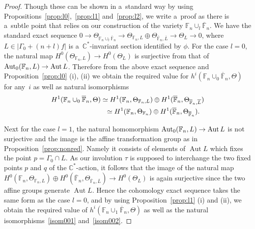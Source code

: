 \documentclass[11pt]{article}
\numberwithin{equation}{section}
\DeclareMathOperator{\Aut}{Aut}
\begin{document}
\begin{proof}
Though these can be shown in a~standard way by using Propositions~\ref{prop:l0},~\ref{prop:l1} and~\ref{prop:l2}, we
write a~proof as there is a~subtle point that relies on our construction of the variety
$\mathbb{F}_n\cup_l\overline{\mathbb{F}}_n$.
We have the standard exact sequence $0 \to \Theta_{\mathbb{F}_n\cup_l \overline{\mathbb{F}}_n} \to
\Theta_{\mathbb{F}_n,L}\oplus\Theta_{\overline{\mathbb{F}}_n,\overline L}\to \Theta_L\to 0$, where $L\in
|\Gamma_0+(n+l)f|$ is a~$\mathbb{C}^*$-invariant section identif\/ied by $\phi$.
For the case $l=0$, the natural map $H^0(\Theta_{\mathbb{F}_n,L}) \to H^0(\Theta_{L})$ is surjective from that of
${\rm{Aut}}_0(\mathbb{F}_n,L)\to \Aut L$.
Therefore from the above exact sequence and Proposition~\ref{prop:l0} (i), (ii) we obtain the required value for $h^i
(\mathbb{F}_n \cup_0 \overline{\mathbb{F}}_n,\Theta)$ for any~$i$ as well as natural isomorphisms {\samepage
\begin{gather}
H^1(\mathbb{F}_n \cup_0 \overline{\mathbb{F}}_n,\Theta)  \simeq H^1(\mathbb{F}_n, \Theta_{\mathbb{F}_n,L}) \oplus H^1
(\overline{\mathbb{F}}_n,\Theta_{\overline{\mathbb{F}}_n,\overline L})
\label{isom001}
\\
\hphantom{H^1(\mathbb{F}_n \cup_0 \overline{\mathbb{F}}_n,\Theta)}{}
\simeq H^1(\mathbb{F}_n, \Theta_{\mathbb{F}_n}) \oplus H^1 (\overline{\mathbb{F}}_n,\Theta_{\overline{\mathbb{F}}_n}).
\label{isom002}
\end{gather}}

\noindent
Next  for the case $l=1$, the natural homomorphism ${\rm{Aut}}_0(\mathbb{F}_n,L)\to \Aut L$ is not surjective and the
image is the af\/f\/ine transformation group as in Proposition~\ref{prop:nonred}.
Namely it consists of elements of $\Aut L$ which f\/ixes the point $p=\Gamma_0\cap L$.
As our involution $\tau$ is supposed to interchange the two f\/ixed points $p$ and $q$ of the $\mathbb{C}^*$-action, it
follows that the image of the natural map $H^0(\mathbb{F}_n, \Theta_{\mathbb{F}_n,L}) \oplus H^0
(\overline{\mathbb{F}}_n,\Theta_{\overline{\mathbb{F}}_n,\overline L})\to H^0(\Theta_L)$ is again surjective since the
two af\/f\/ine groups generate $\Aut L$.
Hence the cohomology exact sequence takes the same form as the case $l=0$, and by using Proposition~\ref{prop:l1} (i)
and (ii), we obtain the required value of $h^i (\mathbb{F}_n \cup_1 \overline{\mathbb{F}}_n,\Theta)$ as well as the
natural isomorphisms~\eqref{isom001} and~\eqref{isom002}.


\end{proof}
\end{document}
